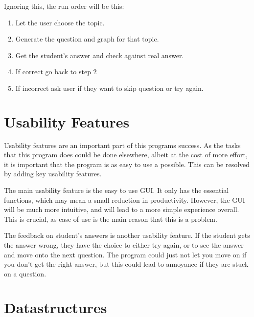 Ignoring this, the run order will be this:
\begin{enumerate}
	\item Let the user choose the topic.
	\item Generate the question and graph for that topic.
	\item Get the student's answer and check against real answer.
	\item If correct go back to step 2
	\item If incorrect ask user if they want to skip question or try again.
\end{enumerate} 


\section{Usability Features}
Usability features are an important part of this programs success. As the tasks that this program does could be done elsewhere, albeit at the cost of more effort, it is important that the program is as easy to use a possible. This can be resolved by adding key usability features.

The main usability feature is the easy to use GUI. It only has the essential functions, which may mean a small reduction in productivity. However, the GUI will be much more intuitive, and will lead to a more simple experience overall. This is crucial, as ease of use is the main reason that this is a problem.

The feedback on student's answers is another usability feature. If the student gets the answer wrong, they have the choice to either try again, or to see the answer and move onto the next question. The program could just not let you move on if you don't get the right answer, but this could lead to annoyance if they are stuck on a question.

\section{Datastructures}
